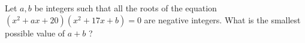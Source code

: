 Let $a, b$ be integers such that all the roots of the equation $(x^2+ax+20)(x^2+17x+b) = 0$ are negative integers. What is the smallest possible value of $a + b$ ?
